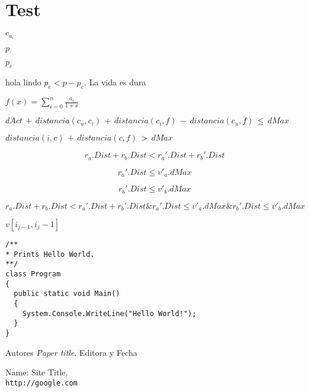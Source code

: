 
\chapter{Test}




$c_{a_i}$

$p$

$p_e$

hola lindo $p_e < p - p_e$. La vida es dura

\( f(x) = \sum_{i=0}^{n} \frac{a_i}{1+x} \)

\( dAct\, +\, distancia(c_u, c_i)\, +\, distancia(c_i, f)\, -\, distancia(c_u, f)\, \leq\, dMax\)

\( distancia(i, c)\, +\, distancia(c, f)\, >\, dMax\)


\begin{equation*}
r_a.Dist + r_b.Dist < r_a'.Dist + r_b'.Dist \nonumber
\end{equation*}

\begin{equation*}
r_a'.Dist \leq v'_a.dMax
\end{equation*}

\begin{equation*}
r_b'.Dist \leq v'_b.dMax
\end{equation*}

\( r_a.Dist + r_b.Dist < r_a'.Dist + r_b'.Dist \& r_a'.Dist \leq v'_a.dMax \& r_b'.Dist \leq v'_b.dMax \)

$v[i_{j-1}, i_j-1]$

\begin{lstlisting}
/**
* Prints Hello World.
**/
class Program
{
  public static void Main()
  {
    System.Console.WriteLine("Hello World!");
  }
}
\end{lstlisting}


Autores
\textit{Paper title}. 
Editora y Fecha
 
Name: Site Title,
\\\texttt{http://google.com}